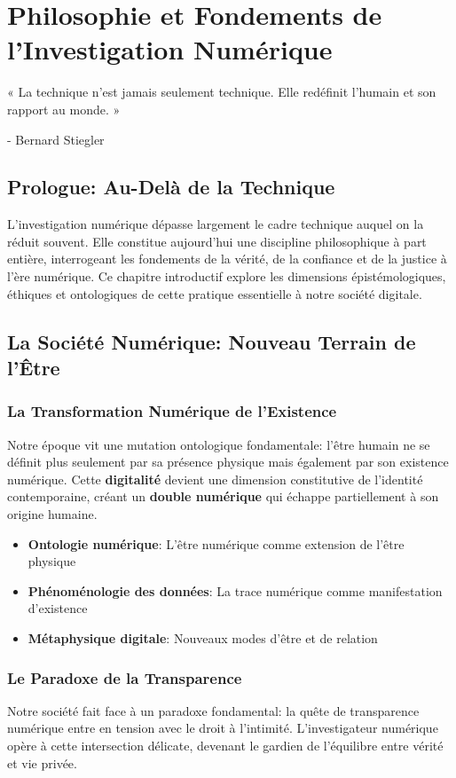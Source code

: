 \chapter{Philosophie et Fondements de l'Investigation Numérique}

\epigraph{« La technique n'est jamais seulement technique. Elle redéfinit l'humain et son rapport au monde. »}{- Bernard Stiegler}

\section*{Prologue: Au-Delà de la Technique}
L'investigation numérique dépasse largement le cadre technique auquel on la réduit souvent. Elle constitue aujourd'hui une discipline philosophique à part entière, interrogeant les fondements de la vérité, de la confiance et de la justice à l'ère numérique. Ce chapitre introductif explore les dimensions épistémologiques, éthiques et ontologiques de cette pratique essentielle à notre société digitale.

\section{La Société Numérique: Nouveau Terrain de l'Être}
\subsection{La Transformation Numérique de l'Existence}
Notre époque vit une mutation ontologique fondamentale: l'être humain ne se définit plus seulement par sa présence physique mais également par son existence numérique. Cette \textbf{digitalité} devient une dimension constitutive de l'identité contemporaine, créant un \textbf{double numérique} qui échappe partiellement à son origine humaine.

\begin{itemize}
\item \textbf{Ontologie numérique}: L'être numérique comme extension de l'être physique
\item \textbf{Phénoménologie des données}: La trace numérique comme manifestation d'existence
\item \textbf{Métaphysique digitale}: Nouveaux modes d'être et de relation
\end{itemize}

\subsection{Le Paradoxe de la Transparence}
Notre société fait face à un paradoxe fondamental: la quête de transparence numérique entre en tension avec le droit à l'intimité. L'investigateur numérique opère à cette intersection délicate, devenant le gardien de l'équilibre entre vérité et vie privée.

